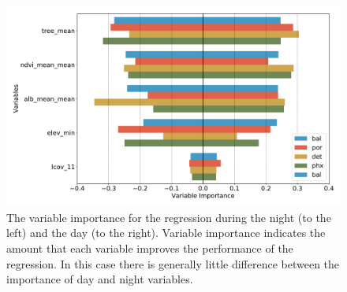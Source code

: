 \documentclass[]{elsarticle}
\begin{document}
\begin{figure}[h]
\begin{center}
\includegraphics[width=\textwidth]{fig/report/variable_importance_selected.pdf}
\caption{The variable importance for the regression during the night (to the left) and the day (to the right). Variable importance indicates the amount that each variable improves the performance of the regression.
In this case there is generally little difference between the importance of day and night variables.}
\label{fig:importance}
\end{center}
\end{figure}
\end{document}
